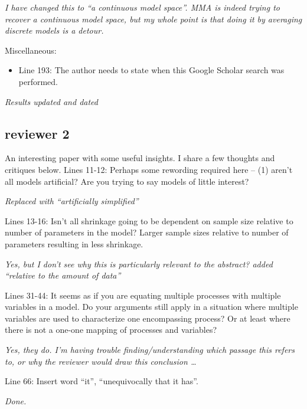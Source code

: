 \documentclass[12pt]{article}
\providecommand{\tightlist}{%
  \setlength{\itemsep}{0pt}\setlength{\parskip}{0pt}}
\begin{document}
\emph{I have changed this to ``a continuous model space''. MMA is indeed
trying to recover a continuous model space, but my whole point is that
doing it by averaging discrete models is a detour.}

Miscellaneous:

\begin{itemize}
\tightlist
\item
  Line 193: The author needs to state when this Google Scholar search
  was performed.
\end{itemize}

\emph{Results updated and dated}

\pagebreak

\subsection{reviewer 2}\label{reviewer-2}

An interesting paper with some useful insights. I share a few thoughts
and critiques below. Lines 11-12: Perhaps some rewording required here
-- (1) aren't all models artiﬁcial? Are you trying to say models of
little interest?

\emph{Replaced with ``artificially simplified''}

Lines 13-16: Isn't all shrinkage going to be dependent on sample size
relative to number of parameters in the model? Larger sample sizes
relative to number of parameters resulting in less shrinkage.

\emph{Yes, but I don't see why this is particularly relevant to the
abstract? added ``relative to the amount of data''}

Lines 31-44: It seems as if you are equating multiple processes with
multiple variables in a model. Do your arguments still apply in a
situation where multiple variables are used to characterize one
encompassing process? Or at least where there is not a one-one mapping
of processes and variables?

\emph{Yes, they do. I'm having trouble finding/understanding which
passage this refers to, or why the reviewer would draw this conclusion
\ldots{}}

Line 66: Insert word ``it'', ``unequivocally that it has''.

\emph{Done.}
\end{document}
